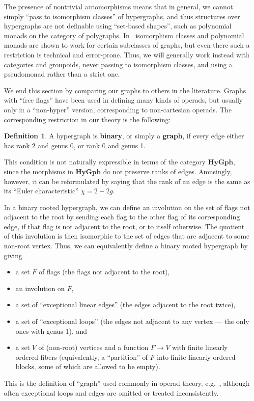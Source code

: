 \documentclass{article}
\theoremstyle{definition}
\newtheorem{defn}[thm]{Definition}
\theoremstyle{remark}
\def\genus{\mathsf{genus}}
\def\rank{\mathsf{rank}}
\def\hy{\mathbf{HyGph}}
\begin{document}
The presence of nontrivial automorphisms means that in general, we cannot simply ``pass to isomorphism classes'' of hypergraphs, and thus structures over hypergraphs are not definable using ``set-based shapes'', such as polynomial monads on the category of polygraphs.
In~\cite{bb:htapm} isomorphism classes and polynomial monads are shown to work for certain subclasses of graphs, but even there such a restriction is technical and error-prone.
Thus, we will generally work instead with categories and groupoids, never passing to isomorphism classes, and using a pseudomonad rather than a strict one.

We end this section by comparing our graphs to others in the literature.
Graphs with ``free flags'' have been used in defining many kinds of operads, but usually only in a ``non-hyper'' version, corresponding to non-cartesian operads.
The corresponding restriction in our theory is the following:

\begin{defn}
  A hypergraph is \textbf{binary}, or simply a \textbf{graph}, if %
  every edge either has rank 2 and genus 0, or rank 0 and genus 1.
\end{defn}

This condition is not naturally expressible in terms of the category $\hy$, since the morphisms in $\hy$ do not preserve ranks of edges.
Amusingly, however, it can be reformulated by saying that the rank of an edge is the same as its ``Euler characteristic'' $\chi=2-2g$.

In a binary rooted hypergraph, we can define an involution on the set of flags not adjacent to the root by sending each flag to the other flag of its corresponding edge, if that flag is not adjacent to the root, or to itself otherwise.
The quotient of this involution is then isomorphic to the set of edges that are adjacent to some non-root vertex.
Thus, we can equivalently define a binary rooted hypergraph by giving
\begin{itemize}
\item a set $F$ of flags (the flags not adjacent to the root),
\item an involution on $F$,
\item a set of ``exceptional linear edges'' (the edges adjacent to the root twice),
\item a set of ``exceptional loops'' (the edges not adjacent to any vertex --- the only ones with genus 1), and
\item a set $V$ of (non-root) vertices and a function $F\to V$ with finite linearly ordered fibers (equivalently, a ``partition'' of $F$ into finite linearly ordered blocks, some of which are allowed to be empty).
\end{itemize}
This is the definition of ``graph'' used commonly in operad theory, e.g.~\cite{bm:gen-opds,km:gwcqceg,costello:ainf,mms:wheeled-props,gk:modular-operads}, although often exceptional loops and edges are omitted or treated inconsistently.
\end{document}
